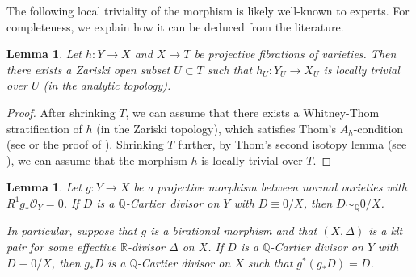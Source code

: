 \documentclass[11pt,oneside,reqno]{amsart}
\numberwithin{equation}{section}
\newtheorem{lemma}[proposition]{Lemma}
\theoremstyle{definition}
\newcommand{\bQ}{\mathbb{Q}}
\newcommand{\mO}{\mathcal{O}}
\begin{document}
The following local triviality of the morphism is likely well-known to experts. For completeness, we explain how it can be deduced from the literature. 

\begin{lemma}\label{lem: trivial morph}
    Let $h:Y \to X$ and $X \to T$ be projective fibrations of varieties. Then there exists a Zariski open subset $U \subset T$ such that $h_U: Y_U \to X_U$ is locally trivial over $U$ (in the analytic topology).
\end{lemma}
\begin{proof}
    After shrinking $T$, we can assume that there exists a Whitney-Thom stratification of $h$ (in the Zariski topology), which satisfies Thom's  $A_h$-condition (see \cite[Page 247, Theorem 2]{Hir77} or the proof of \cite[Page 248, Corollary 1]{Hir77}). Shrinking $T$ further, by Thom’s second isotopy lemma (see \cite[Proposition 11.1]{Mat22}), we can assume that the morphism $h$ is locally trivial over $T$. 
\end{proof}

\begin{lemma}\label{lem: trivial div}
Let $g: Y \to X$ be a projective morphism between normal varieties with $R^1g_{*}\mO_{Y}=0$. If $D$ is a $\mathbb{Q}$-Cartier divisor on $Y$ with $D \equiv 0/X$, then $D\sim_\bQ 0/X$.

In particular, suppose that $g$ is a birational morphism and that $(X, \Delta)$ is a klt pair for some effective $\mathbb{R}$-divisor $\Delta$ on $X$. If $D$ is a $\mathbb{Q}$-Cartier divisor on $Y$ with $D \equiv 0/X$, then $g_*D$ is a $\mathbb{Q}$-Cartier divisor on $X$ such that $g^*(g_*D) = D$.
\end{lemma}
\end{document}
